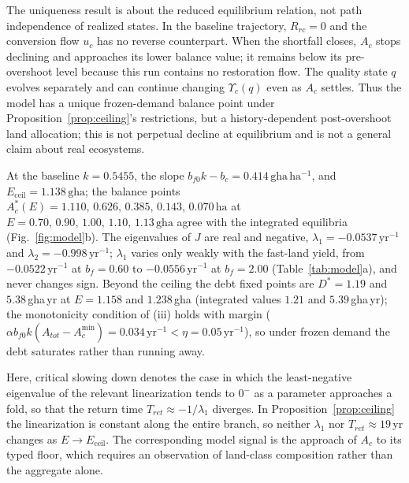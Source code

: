 \documentclass[preprint,12pt,authoryear]{elsarticle}
\newcommand{\Ups}{\Upsilon_c}
\newcommand{\Eceil}{E_{\mathrm{ceil}}}
\newcommand{\Acmin}{A_c^{\min}}
\begin{document}
The uniqueness result is about the reduced equilibrium relation, not path independence of realized states. In the baseline trajectory, $R_{rc}=0$ and the conversion flow $u_c$ has no reverse counterpart. When the shortfall closes, $A_c$ stops declining and approaches its lower balance value; it remains below its pre-overshoot level because this run contains no restoration flow. The quality state $q$ evolves separately and can continue changing $\Ups(q)$ even as $A_c$ settles. Thus the model has a unique frozen-demand balance point under Proposition~\ref{prop:ceiling}'s restrictions, but a history-dependent post-overshoot land allocation; this is not perpetual decline at equilibrium and is not a general claim about real ecosystems.

At the baseline $k=0.5455$, the slope $b_{f0}k-b_c=0.414\,\mathrm{gha\,ha^{-1}}$, and $\Eceil=1.138\,\mathrm{gha}$; the balance points $A_c^*(E)=1.110,\,0.626,\,0.385,\,0.143,\,0.070\,\mathrm{ha}$ at $E=0.70,\,0.90,\,1.00,\,1.10,\,1.13\,\mathrm{gha}$ agree with the integrated equilibria (Fig.~\ref{fig:model}b). The eigenvalues of $J$ are real and negative, $\lambda_1=-0.0537\,\mathrm{yr}^{-1}$ and $\lambda_2=-0.998\,\mathrm{yr}^{-1}$; $\lambda_1$ varies only weakly with the fast-land yield, from $-0.0522\,\mathrm{yr}^{-1}$ at $b_f=0.60$ to $-0.0556\,\mathrm{yr}^{-1}$ at $b_f=2.00$ (Table~\ref{tab:model}a), and never changes sign. Beyond the ceiling the debt fixed points are $D^*=1.19$ and $5.38$\,gha\,yr at $E=1.158$ and $1.238$\,gha (integrated values $1.21$ and $5.39$\,gha\,yr); the monotonicity condition of (iii) holds with margin ($\alpha b_{f0}k(A_{tot}-\Acmin)=0.034\,\mathrm{yr}^{-1}<\eta=0.05\,\mathrm{yr}^{-1}$), so under frozen demand the debt saturates rather than running away.

Here, critical slowing down denotes the case in which the least-negative eigenvalue of the relevant linearization tends to $0^-$ as a parameter approaches a fold, so that the return time $T_{ret}\approx-1/\lambda_1$ diverges. In Proposition~\ref{prop:ceiling} the linearization is constant along the entire branch, so neither $\lambda_1$ nor $T_{ret}\approx19$\,yr changes as $E\to\Eceil$. The corresponding model signal is the approach of $A_c$ to its typed floor, which requires an observation of land-class composition rather than the aggregate alone.
\end{document}
